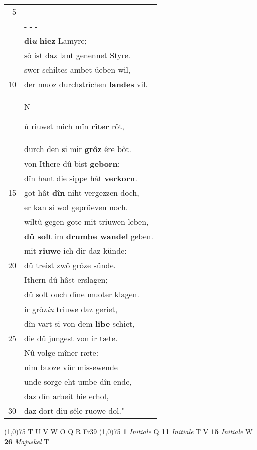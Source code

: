 \documentclass[8pt,a4paper,notitlepage]{article}
\begin{document}
\begin{table}[ht]
\begin{minipage}[t]{0.5\linewidth}
\begin{tabular}{rl}
5 & \multicolumn{1}{l}{ - - - }\\ 
 & \multicolumn{1}{l}{ - - - }\\ 
 & \textbf{di\textit{u}} \textbf{hiez} Lamyre;\\ 
 & sô ist daz lant genennet Styre.\\ 
 & swer schiltes ambet üeben wil,\\ 
10 & der muoz durchstrîchen \textbf{landes} vil.\\ 
 & \begin{large}N\end{large}û riuwet mich mîn \textbf{rîter} rôt,\\ 
 & durch den si mir \textbf{grôz} êre bôt.\\ 
 & von Ithere dû bist \textbf{geborn};\\ 
 & dîn hant die sippe hât \textbf{verkorn}.\\ 
15 & got hât \textbf{dîn} niht vergezzen doch,\\ 
 & er kan si wol geprüeven noch.\\ 
 & wiltû gegen gote mit triuwen leben,\\ 
 & \textbf{dû solt} im \textbf{drumbe wandel} geben.\\ 
 & mit \textbf{riuwe} ich dir daz künde:\\ 
20 & dû treist zwô grôze sünde.\\ 
 & Ithern dû hâst erslagen;\\ 
 & dû solt ouch dîne muoter klagen.\\ 
 & ir grôz\textit{iu} triuwe daz geriet,\\ 
 & dîn vart si von dem \textbf{lîbe} schiet,\\ 
25 & die dû jungest von ir tæte.\\ 
 & Nû volge mîner ræte:\\ 
 & nim buoze vür missewende\\ 
 & unde sorge eht umbe dîn ende,\\ 
 & daz dîn arbeit hie erhol,\\ 
30 & daz dort diu sêle ruowe dol."\\ 
\end{tabular}
\scriptsize
\line(1,0){75} \newline
T U V W O Q R Fr39 \newline
\line(1,0){75} \newline
\textbf{1} \textit{Initiale} Q  \textbf{11} \textit{Initiale} T V  \textbf{15} \textit{Initiale} W  \textbf{26} \textit{Majuskel} T  \newline

\end{minipage}
\end{table}
\end{document}
